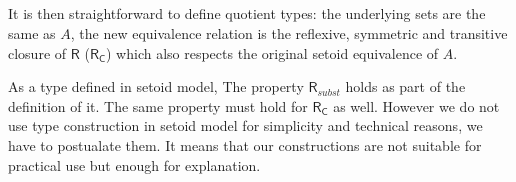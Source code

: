 \begin{code}
\>[12]\<[18]%
\>[18] \AgdaFunction{<}    \AgdaFunction{>}\<%
\\
\>[0]\<[12]%
\>[12]\AgdaSymbol{;}  \AgdaSymbol{=}          \<[48]%
\>[48]\<%
\\
\>[0]\<[20]%
\>[20]            \AgdaSymbol{(}  \AgdaSymbol{))))))}\<%
\\
\>[0]\<[12]%
\>[12]\AgdaSymbol{\}}\<%
\\
\end{code}

It is then straightforward to define quotient types: the underlying sets are the same as $A$, the new equivalence relation is the reflexive, symmetric and transitive closure of $\mathsf{R}$ ($\mathsf{R_C}$) which also respects the original setoid equivalence of $A$.

As a type defined in setoid model, The property $\mathsf{R}_{subst}$ holds as part of the definition of it. The same property must hold for $\mathsf{R_C}$ as well. However we do not use type construction in setoid model for simplicity and technical reasons, we have to postualate them. It means that our constructions are not suitable for practical use but enough for explanation.

